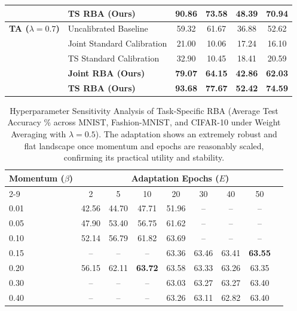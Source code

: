 \documentclass{article}
\begin{document}
\begin{table}[t]
\begin{center}
\begin{small}
\begin{tabular}{llcccc}
        & \textbf{TS RBA (Ours)} & \textbf{90.86} & \textbf{73.58} & \textbf{48.39} & \textbf{70.94} \\
        \midrule
        \textbf{TA ($\lambda=0.7$)} & Uncalibrated Baseline & 59.32 & 61.67 & 36.88 & 52.62 \\
        & Joint Standard Calibration & 21.00 & 10.06 & 17.24 & 16.10 \\
        & TS Standard Calibration & 32.90 & 10.45 & 18.41 & 20.59 \\
        & \textbf{Joint RBA (Ours)} & \textbf{79.07} & \textbf{64.15} & \textbf{42.86} & \textbf{62.03} \\
        & \textbf{TS RBA (Ours)} & \textbf{93.68} & \textbf{77.67} & \textbf{52.42} & \textbf{74.59} \\
        \bottomrule
      \end{tabular}
    \end{small}
  \end{center}
  \vskip -0.1in
\end{table}

\begin{table}[t]
  \caption{Hyperparameter Sensitivity Analysis of Task-Specific RBA (Average Test Accuracy \% across MNIST, Fashion-MNIST, and CIFAR-10 under Weight Averaging with $\lambda=0.5$). The adaptation shows an extremely robust and flat landscape once momentum and epochs are reasonably scaled, confirming its practical utility and stability.}
  \label{tab:hparams}
  \vskip 0.15in
  \begin{center}
    \begin{small}
      \begin{tabular}{lcccccccc}
        \toprule
        Momentum ($\beta$) & \multicolumn{8}{c}{Adaptation Epochs ($E$)} \\
        \cmidrule{2-9}
        & 2 & 5 & 10 & 20 & 30 & 40 & 50 \\
        \midrule
        0.01 & 42.56 & 44.70 & 47.71 & 51.96 & -- & -- & -- \\
        0.05 & 47.90 & 53.40 & 56.75 & 61.62 & -- & -- & -- \\
        0.10 & 52.14 & 56.79 & 61.82 & 63.69 & -- & -- & -- \\
        0.15 & -- & -- & -- & 63.36 & 63.46 & 63.41 & \textbf{63.55} \\
        0.20 & 56.15 & 62.11 & \textbf{63.72} & 63.58 & 63.33 & 63.26 & 63.35 \\
        0.30 & -- & -- & -- & 63.03 & 63.27 & 63.27 & 63.40 \\
        0.40 & -- & -- & -- & 63.26 & 63.11 & 62.82 & 63.40 \\
        \bottomrule
      \end{tabular}
    \end{small}
  \end{center}
  \vskip -0.1in
\end{table}
\end{document}
